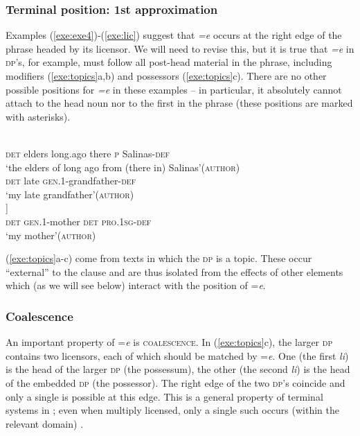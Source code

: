 \documentclass[output=paper,
modfonts
]{LSP/langsci}
\begin{document}
\subsubsection{Terminal position: 1st approximation}
Examples (\ref{exe:exe4})-(\ref{exe:lic})  suggest that \emph{=e} occurs at the right edge of the phrase headed by its licensor.
We will need to revise this, but it is true that  \emph{=e} in \textsc{dp}'s, for example, 
must follow all post-head material in the phrase, including modifiers (\ref{exe:topics}a,b) and possessors (\ref{exe:topics}c).  
There are no other possible positions for \emph{=e} in these examples  --  in particular, it absolutely cannot  
attach to the head noun nor to the first  in the phrase (these positions are marked with asterisks). 
\begin{exe}
\ex\label{exe:topics}
\begin{xlist}
\bridgeoverex
{}
\gll [\tikzmarkfullnamed{a}{ti} moletik * vo'ne tey ta Ats'am=\tikzmarkfullnamed{b}{e}] \\  
\textsc{det} elders {} long.ago there \textsc{p} Salinas-\textsc{def} \\
\glt `the elders of long ago from (there in) Salinas'(\textsc{author})
\bridgeoverex
{}
\gll [\tikzmarkfullnamed{c}{ti} anima * j-muk'tot=\tikzmarkfullnamed{d}{e}]  \\ 
\textsc{det} late {} \textsc{gen.1}-grandfather-\textsc{def} \\
\glt `my late grandfather'(\textsc{author}) \\
\bridgeoverex
{}
\gll [\tikzmarkfullnamed{e}{li} j-me' * [\tikzmarkfullnamed{f}{li} vo'on=\tikzmarkfullnamed{g}{e}]] \\ 
\textsc{det} \textsc{gen.1}-mother {}  \textsc{det} \textsc{pro.1sg-def} \\
\glt `my mother'(\textsc{author})
\end{xlist}
\end{exe}
(\ref{exe:topics}a-c) come from texts in which the \textsc{dp} is a topic. These occur ``external'' to the clause and are thus isolated from the effects of other elements which (as we
will see below) interact with the position of =\emph{e}.

 \subsubsection{Coalescence}
An important property of =\emph{e} is  \textsc{coalescence}.  In (\ref{exe:topics}c),
the larger \textsc{dp} contains two licensors, each of which should be matched by =\emph{e}. 
One (the first \emph{li}) is the head of the larger \textsc{dp} (the possessum), the other (the second \emph{li})  is the head of the embedded \textsc{dp} (the possessor). 
The right edge of the two \textsc{dp}'s coincide and only a single  is possible at this edge. This is a general property of
 terminal  systems in ; even when multiply licensed, 
 only a single such  occurs (within the relevant domain) \citep{skopeteas2010}. 
\end{document}
